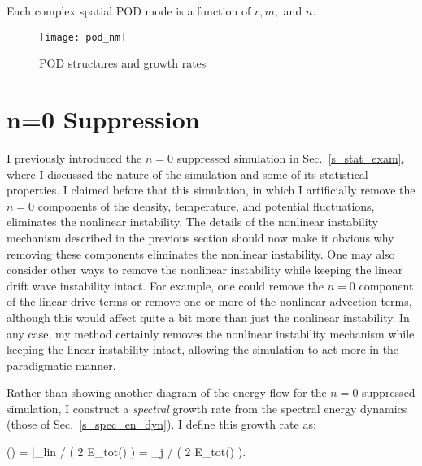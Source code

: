 Each complex spatial POD mode is a function of $r, m,$ and $n$.

\begin{figure}[!ht]
\centerline{\texttt{[image: pod\_nm]}}
\caption{POD structures and growth rates}
\label{pod_nm}
\end{figure}


\section{n=0 Suppression}
\label{ss_n0_supp}

I previously introduced the $n=0$ suppressed simulation in Sec.~\ref{s_stat_exam}, where I discussed the nature of the simulation and some of its statistical properties. I claimed before that
this simulation, in which I artificially remove the $n=0$ components of the density, temperature, and potential fluctuations, eliminates the nonlinear instability.
The details of the nonlinear instability mechanism described in the previous section should now make it obvious why removing these components eliminates the nonlinear instability.
One may also consider other ways to remove the nonlinear instability while keeping the linear drift wave instability intact. For example, one could remove the $n=0$ component of the linear
drive terms or remove one or more of the nonlinear advection terms, although this would affect quite a bit more than just the nonlinear instability. In any case, my method
certainly removes the nonlinear instability mechanism while keeping the linear instability intact, allowing the simulation to act more in the paradigmatic manner.

Rather than showing another diagram of the energy flow for the $n=0$ suppressed simulation, I construct a \emph{spectral} growth rate from the spectral energy dynamics 
(those of Sec.~\ref{s_spec_en_dyn}). I define this growth rate as:

\beq
\label{gamma_def}
\gamma() =  \bigg|_{lin} \bigg/ \left( 2 E_{tot}() \right) = \sum_j  \bigg/ \left( 2 E_{tot}() \right).
\eeq

